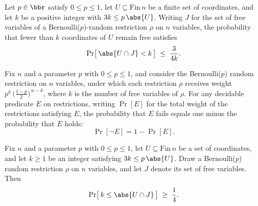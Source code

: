 \begin{theorem}
\label{RestrictionFourier.bernoulliRestrProb_card_inter_lt}
\leanok
{}
Let $p \in \bbr$ satisfy $0 \le p \le 1$, let $U \subseteq \mathrm{Fin}\,n$ be a finite
set of coordinates, and let $k$ be a positive integer with $3k \le p\,\abs{U}$. Writing
$J$ for the set of free variables of a Bernoulli($p$)-random restriction $\rho$ on $n$
variables, the probability that fewer than $k$ coordinates of $U$ remain free satisfies
\[
  \Pr\bigl[\,\abs{U \cap J} < k\,\bigr] \;\le\; \frac{3}{4k}.
\]
\end{theorem}

\begin{lemma}
\label{RestrictionFourier.bernoulliRestrProb_not}
\leanok
{}
Fix $n$ and a parameter $p$ with $0 \le p \le 1$, and consider the Bernoulli($p$) random
restriction on $n$ variables, under which each restriction $\rho$ receives weight
$p^{k}\,\bigl(\tfrac{1-p}{2}\bigr)^{\,n-k}$, where $k$ is the number of free variables
of $\rho$. For any decidable predicate $E$ on restrictions, writing $\Pr[E]$ for the
total weight of the restrictions satisfying $E$, the probability that $E$ fails equals
one minus the probability that $E$ holds:
\[
  \Pr[\lnot E] = 1 - \Pr[E].
\]
\end{lemma}

\begin{theorem}
\label{RestrictionFourier.bernoulliRestrProb_card_inter_ge}
\leanok
{}
Fix $n$ and a parameter $p$ with $0 \le p \le 1$, let $U \subseteq \mathrm{Fin}\,n$ be a
set of coordinates, and let $k \ge 1$ be an integer satisfying $3k \le p\,\abs{U}$. Draw
a Bernoulli($p$) random restriction $\rho$ on $n$ variables, and let $J$ denote its set
of free variables. Then
\[
  \Pr\bigl[\,k \le \abs{U \cap J}\,\bigr] \;\ge\; \frac{1}{4}.
\]
\end{theorem}
